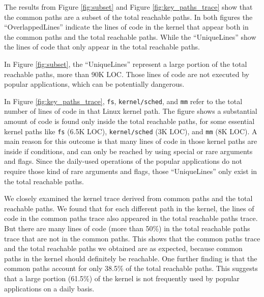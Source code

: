 The results from Figure \ref{fig:subset} and Figure \ref{fig:key_paths_trace}
show that the common paths are a subset of the
total reachable paths.
In both figures
the ``OverlappedLines'' indicate the lines of code
in the kernel that appear both in the common paths and the total reachable
paths. While the ``UniqueLines'' show the lines of code that only appear in
the total reachable paths.

In Figure \ref{fig:subset}, the ``UniqueLines''
represent a large portion of the total reachable paths, more than 90K LOC.
Those lines of code are not executed by popular applications, which can be
potentially dangerous.

In Figure \ref{fig:key_paths_trace}, \texttt{fs}, \texttt{kernel/sched},
and \texttt{mm} refer to the total number of lines of code in that Linux kernel path.
The figure shows a
substantial amount of code is found only inside the total reachable paths,
for some essential kernel paths like \texttt{fs} (6.5K LOC),
\texttt{kernel/sched} (3K LOC),
and \texttt{mm} (8K LOC).
A main reason for this outcome is that many lines of code in those kernel paths
are inside if conditions, and can only be reached by using special or
rare arguments and flags. Since the daily-used operations of
the popular applications do not require those kind of rare arguments
and flags, those ``UniqueLines'' only exist in the total reachable paths.

We closely examined the kernel trace derived from common paths
and the total reachable paths. We found that for each different path
in the kernel, the lines of code
in the common paths trace also appeared in the total reachable paths trace.
But there are many lines of code (more than 50\%)
in the total reachable paths trace that are not in the common paths. This
shows that the common paths trace and
the total reachable paths we obtained are as expected, because common paths in
the kernel should definitely be reachable.
One further finding is that the common paths account
for only 38.5\% of the total reachable paths.
This suggests that a large portion (61.5\%) of the kernel is not frequently
used by popular applications on a daily basis.

